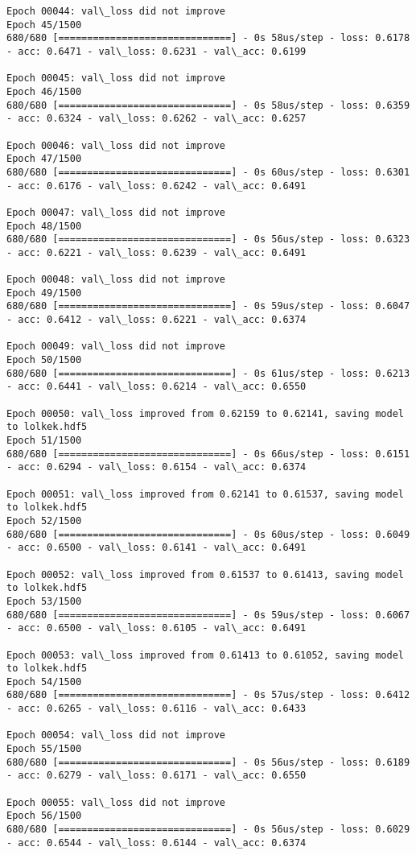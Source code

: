 \documentclass[11pt]{article}
\begin{document}
\begin{Verbatim}[commandchars=\\\{\}]
Epoch 00044: val\_loss did not improve
Epoch 45/1500
680/680 [==============================] - 0s 58us/step - loss: 0.6178 - acc: 0.6471 - val\_loss: 0.6231 - val\_acc: 0.6199

Epoch 00045: val\_loss did not improve
Epoch 46/1500
680/680 [==============================] - 0s 58us/step - loss: 0.6359 - acc: 0.6324 - val\_loss: 0.6262 - val\_acc: 0.6257

Epoch 00046: val\_loss did not improve
Epoch 47/1500
680/680 [==============================] - 0s 60us/step - loss: 0.6301 - acc: 0.6176 - val\_loss: 0.6242 - val\_acc: 0.6491

Epoch 00047: val\_loss did not improve
Epoch 48/1500
680/680 [==============================] - 0s 56us/step - loss: 0.6323 - acc: 0.6221 - val\_loss: 0.6239 - val\_acc: 0.6491

Epoch 00048: val\_loss did not improve
Epoch 49/1500
680/680 [==============================] - 0s 59us/step - loss: 0.6047 - acc: 0.6412 - val\_loss: 0.6221 - val\_acc: 0.6374

Epoch 00049: val\_loss did not improve
Epoch 50/1500
680/680 [==============================] - 0s 61us/step - loss: 0.6213 - acc: 0.6441 - val\_loss: 0.6214 - val\_acc: 0.6550

Epoch 00050: val\_loss improved from 0.62159 to 0.62141, saving model to lolkek.hdf5
Epoch 51/1500
680/680 [==============================] - 0s 66us/step - loss: 0.6151 - acc: 0.6294 - val\_loss: 0.6154 - val\_acc: 0.6374

Epoch 00051: val\_loss improved from 0.62141 to 0.61537, saving model to lolkek.hdf5
Epoch 52/1500
680/680 [==============================] - 0s 60us/step - loss: 0.6049 - acc: 0.6500 - val\_loss: 0.6141 - val\_acc: 0.6491

Epoch 00052: val\_loss improved from 0.61537 to 0.61413, saving model to lolkek.hdf5
Epoch 53/1500
680/680 [==============================] - 0s 59us/step - loss: 0.6067 - acc: 0.6500 - val\_loss: 0.6105 - val\_acc: 0.6491

Epoch 00053: val\_loss improved from 0.61413 to 0.61052, saving model to lolkek.hdf5
Epoch 54/1500
680/680 [==============================] - 0s 57us/step - loss: 0.6412 - acc: 0.6265 - val\_loss: 0.6116 - val\_acc: 0.6433

Epoch 00054: val\_loss did not improve
Epoch 55/1500
680/680 [==============================] - 0s 56us/step - loss: 0.6189 - acc: 0.6279 - val\_loss: 0.6171 - val\_acc: 0.6550

Epoch 00055: val\_loss did not improve
Epoch 56/1500
680/680 [==============================] - 0s 56us/step - loss: 0.6029 - acc: 0.6544 - val\_loss: 0.6144 - val\_acc: 0.6374


\end{Verbatim}
\end{document}

